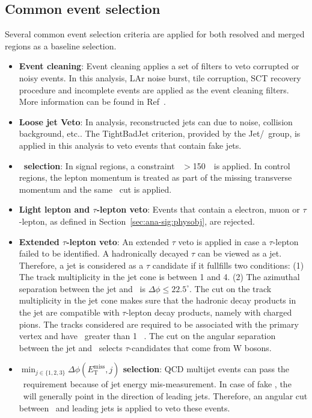 \subsection{Common event selection}
\par Several common event selection criteria are applied for both resolved and merged regions as a baseline selection.
\begin{itemize}
    \item \textbf{Event cleaning}: Event cleaning applies a set of filters to veto corrupted or noisy events. In this analysis, LAr noise burst, tile corruption, SCT recovery procedure and incomplete events are applied as the event cleaning filters. More information can be found in Ref~\cite{c8-evt-cleaning}.
    \item \textbf{Loose jet Veto}: In analysis, reconstructed jets can due to noise, collision background, etc.. The TightBadJet criterion, provided by the Jet/\met~group, is applied in this analysis to veto events that contain fake jets.
    \item \textbf{\met~selection}: In signal regions, a constraint \met~$>$150~\GeV~is applied. In control regions, the lepton momentum is treated as part of the missing transverse momentum and the same \met~cut is applied.
    \item \textbf{Light lepton and $\tau$-lepton veto}: Events that contain a electron, muon or $\tau$-lepton, as defined in Section~\ref{sec:ana-sig:physobj}, are rejected.
    \item \textbf{Extended $\tau$-lepton veto}: An extended $\tau$ veto is applied in case a $\tau$-lepton failed to be identified. A hadronically decayed $\tau$ can be viewed as a jet. Therefore, a jet is considered as a $\tau$ candidate if it fullfills two conditions: (1) The track multiplicity in the jet cone is between 1 and 4. (2) The azimuthal separation between the jet and \met~is $\Delta \phi \leq 22.5^\circ$. The cut on the track multiplicity in the jet cone makes sure that the hadronic decay products in the jet are compatible with $\tau$-lepton decay products, namely with charged pions. The tracks considered are required to be associated with the primary vertex and have \pt~greater than 1 ~\GeV. The cut on the angular separation between the jet and \met~selects $\tau$-candidates that come from W bosons.
    \item \textbf{$\min_{j \in \{1,2,3\}}\Delta\phi(E_{\mathrm{T}}^{\mathrm{miss}},j)$ selection}: QCD multijet events can pass the \met~requirement because of jet energy mis-measurement. In case of fake \met, the \met~will generally point in the direction of leading jets. Therefore, an angular cut between \met~and leading jets is applied to veto these events.
\end{itemize}

